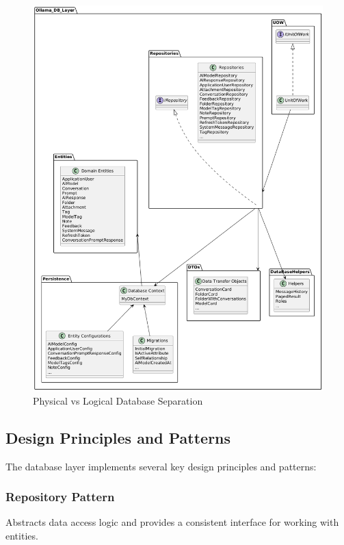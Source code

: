\begin{figure}[p]
    \centering
    \includegraphics[width=\textwidth]{./Chapter05/figures/logical_separation.png}
    \caption{Physical vs Logical Database Separation}
    \label{fig:logical-separation}
\end{figure}
\clearpage

\subsection{Design Principles and Patterns}

The database layer implements several key design principles and patterns:

\subsubsection*{Repository Pattern}

Abstracts data access logic and provides a consistent interface for working with entities.

